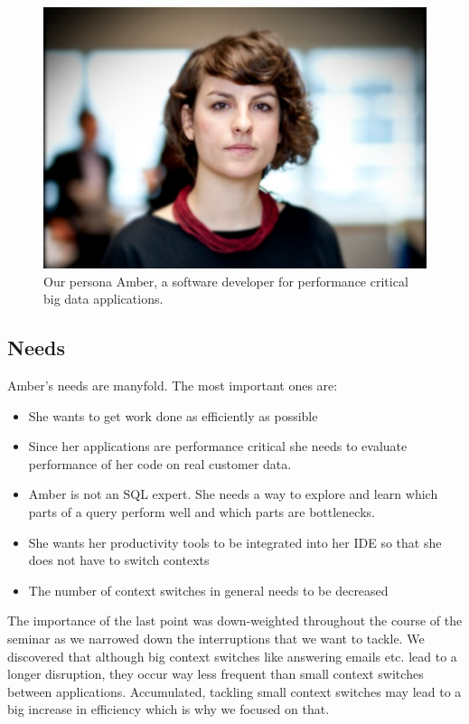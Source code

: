 \begin{figure}
    \includegraphics[width=\linewidth]{images/amber}
    \caption{Our persona Amber, a software developer for performance critical big data applications.}
    \label{fig:amber}
\end{figure}

\subsection{Needs}
Amber's needs are manyfold. The most important ones are:

\begin{itemize}
	\item She wants to get work done as efficiently as possible
	\item Since her applications are performance critical she needs to evaluate performance of her code on real customer data.
	\item Amber is not an SQL expert. She needs a way to explore and learn which parts of a query perform well and which parts are bottlenecks.
	\item She wants her productivity tools to be integrated into her IDE so that she does not have to switch contexts
	\item The number of context switches in general needs to be decreased
\end{itemize}

The importance of the last point was down-weighted throughout the course of the seminar as we narrowed down the interruptions that we want to tackle. We discovered that although big context switches like answering emails etc. lead to a longer disruption, they occur way less frequent than small context switches between applications. Accumulated, tackling small context switches may lead to a big increase in efficiency which is why we focused on that.  

